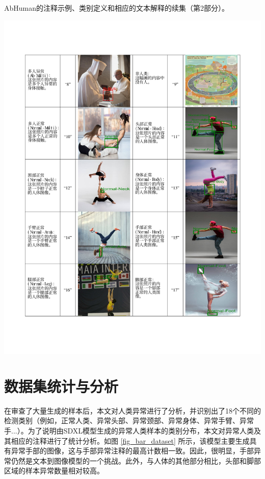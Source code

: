 \begin{table}[ht]
    \centering
     \caption{AbHuman的注释示例、类别定义和相应的文本解释的续集（第2部分）。}
    \includegraphics[width=\textwidth]{fig/Page2.pdf}
    \label{tab:your-label2} 
\end{table}

\section{数据集统计与分析} \label{sec:3.2}
在审查了大量生成的样本后，本文对人类异常进行了分析，并识别出了18个不同的检测类别（例如，正常人类、异常头部、异常颈部、异常身体、异常手臂、异常手...）。为了说明由SDXL模型生成的异常人类样本的类别分布，本文对异常人类及其相应的注释进行了统计分析。如图 \ref{fig_bar_dataset} 所示，该模型主要生成具有异常手部的图像，这与手部异常注释的最高计数相一致。因此，很明显，手部异常仍然是文本到图像模型的一个挑战。此外，与人体的其他部分相比，头部和脚部区域的样本异常数量相对较高。



